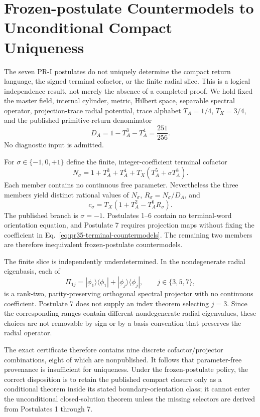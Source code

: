 \section{Frozen-postulate Countermodels to Unconditional Compact Uniqueness}
\label{sec:pr1-compact-countermodels}

The seven PR-I postulates do not uniquely determine the compact return language, the signed terminal cofactor, or the finite radial slice.  This is a logical independence result, not merely the absence of a completed proof.  We hold fixed the master field, internal cylinder, metric, Hilbert space, separable spectral operator, projection-trace radial potential, trace alphabet $T_A=1/4$, $T_X=3/4$, and the published primitive-return denominator
\begin{equation}
 D_A=1-T_A^3-T_A^4=\frac{251}{256}.
\end{equation}
No diagnostic input is admitted.

For $\sigma\in\{-1,0,+1\}$ define the finite, integer-coefficient terminal cofactor
\begin{equation}
 N_\sigma=1+T_A^3+T_A^4+T_X\left(T_A^5+\sigma T_A^8\right).
 \label{eq:pr35-terminal-countermodels}
\end{equation}
Each member contains no continuous free parameter.  Nevertheless the three members yield distinct rational values of $N_\sigma$, $R_\sigma=N_\sigma/D_A$,
and
\begin{equation}
 c_\sigma=T_X\left(1+T_A^2-T_A^6R_\sigma\right).
\end{equation}
The published branch is $\sigma=-1$.  Postulates 1--6 contain no terminal-word orientation equation, and Postulate 7 requires projection maps without fixing the coefficient in Eq.~\eqref{eq:pr35-terminal-countermodels}.  The remaining two members are therefore inequivalent frozen-postulate countermodels.

The finite slice is independently underdetermined.  In the nondegenerate radial eigenbasis, each of
\begin{equation}
 \Pi_{1j}=|\phi_1\rangle\langle\phi_1|+
 |\phi_j\rangle\langle\phi_j|,\qquad j\in\{3,5,7\},
\end{equation}
is a rank-two, parity-preserving orthogonal spectral projector with no continuous coefficient.  Postulate 7 does not supply an index theorem selecting $j=3$.  Since the corresponding ranges contain different nondegenerate radial eigenvalues, these choices are not removable by sign or by a basis convention that preserves the radial operator.

The exact certificate therefore contains nine discrete cofactor/projector combinations, eight of which are nonpublished.  It follows that parameter-free provenance is insufficient for uniqueness.  Under the frozen-postulate policy, the correct disposition is to retain the published compact closure only as a conditional theorem inside its stated boundary-orientation class; it cannot enter the unconditional closed-solution theorem unless the missing selectors are derived from Postulates 1 through 7.
